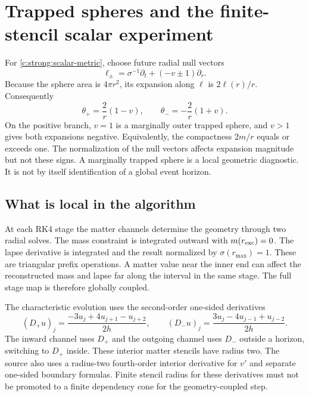 \section{Trapped spheres and the finite-stencil scalar experiment}
\label{c:strong:collapse-evidence}

For \eqref{c:strong:scalar-metric}, choose future radial null vectors
\begin{equation}
 \ell_\pm=\sigma^{-1}\partial_t+(-v\pm1)\partial_r.
\end{equation}
Because the sphere area is $4\pi r^2$, its expansion along $\ell$ is $2\ell(r)/r$. Consequently
\begin{equation}
 \theta_+=\frac2r(1-v),\qquad
 \theta_-=-\frac2r(1+v).
\label{c:strong:expansions}
\end{equation}
On the positive branch, $v=1$ is a marginally outer trapped sphere, and $v>1$ gives both expansions negative. Equivalently, the compactness $2m/r$ equals or exceeds one. The normalization of the null vectors affects expansion magnitude but not these signs. A marginally trapped sphere is a local geometric diagnostic. It is not by itself identification of a global event horizon.

\subsection{What is local in the algorithm}
At each RK4 stage the matter channels determine the geometry through two radial solves. The mass constraint is integrated outward with $m(r_{\rm exc})=0$. The lapse derivative is integrated and the result normalized by $\sigma(r_{\max})=1$. These are triangular prefix operations. A matter value near the inner end can affect the reconstructed mass and lapse far along the interval in the same stage. The full stage map is therefore globally coupled.

The characteristic evolution uses the second-order one-sided derivatives
\begin{equation}
 (D_+u)_j=\frac{-3u_j+4u_{j+1}-u_{j+2}}{2h},\qquad
 (D_-u)_j=\frac{3u_j-4u_{j-1}+u_{j-2}}{2h}.
\end{equation}
The inward channel uses $D_+$ and the outgoing channel uses $D_-$ outside a horizon, switching to $D_+$ inside. These interior matter stencils have radius two. The source also uses a radius-two fourth-order interior derivative for $v'$ and separate one-sided boundary formulas. Finite stencil radius for these derivatives must not be promoted to a finite dependency cone for the geometry-coupled step.

